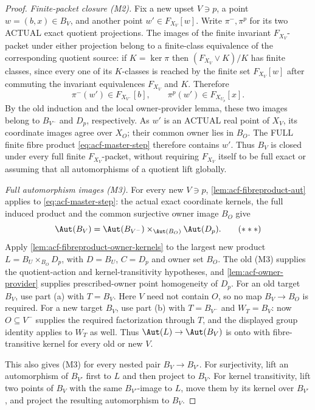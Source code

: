 \begin{proof}
\emph{Finite-packet closure (M2).}
Fix a new upset \(V\ni p\), a point
\(w=(b,x)\in B_V\), and another point
\(w'\in F_{X_V}[w]\). Write \(\pi^-,\pi^p\)
for its two ACTUAL exact quotient
projections. The images of the finite
invariant \(F_{X_V}\)-packet under
either projection belong to a finite-class
equivalence of the corresponding
quotient source: if \(K=\ker\pi\)
then \((F_{X_V}\vee K)/K\) has finite
classes, since every one of its
\(K\)-classes is reached by the finite
set \(F_{X_V}[w]\) after commuting
the invariant equivalences
\(F_{X_V}\) and \(K\).
Therefore
\[
 \pi^-(w')\in F_{X_{V^-}}[b],
 \qquad
 \pi^p(w')\in F_{X_{U_p}}[x].
\]
By the old induction and the
local owner-provider lemma, these
two images belong to
\(B_{V^-}\) and \(D_p\),
respectively. As \(w'\) is an
ACTUAL real point of \(X_V\),
its coordinate images agree
over \(X_O\); their common owner
lies in \(B_O\).
The FULL finite fibre product
\eqref{eq:acf-master-step} therefore
contains \(w'\). Thus \(B_V\)
is closed under every full finite
\(F_{X_V}\)-packet, without
requiring \(F_{X_V}\) itself
to be full exact or assuming that
all automorphisms of a quotient
lift globally.

\emph{Full automorphism images (M3).}
For every new $V\ni p$, \cref{lem:acf-fibreproduct-aut} applies to
\eqref{eq:acf-master-step}: the actual exact coordinate kernels,
the full induced product and the common surjective owner image
$B_O$ give
\[
 \Aut(B_V)=
       \Aut(B_{V^-})\times_{\Aut(B_O)}\Aut(D_p).
       \tag{\(\ast\ast\ast\)}
\]
Apply \cref{lem:acf-fibreproduct-owner-kernels} to the largest new
product $L=B_U\times_{B_O}D_p$, with $D=B_U$, $C=D_p$ and
owner set $B_O$. The old (M3) supplies the quotient-action and
kernel-transitivity hypotheses, and
\cref{lem:acf-owner-provider} supplies prescribed-owner point
homogeneity of $D_p$.
For an old target $B_V$, use part (a) with $T=B_V$.
Here $V$ need not contain $O$, so no map $B_V\to B_O$ is required.
For a new target $B_V$, use part (b) with $T=B_{V^-}$ and
$W_T=B_V$: now $O\subseteq V^-$ supplies the required
factorization through $T$, and the displayed group identity
applies to $W_T$ as well.
Thus $\Aut(L)\to\Aut(B_V)$ is onto with fibre-transitive
kernel for every old or new $V$.

This also gives (M3) for every nested pair $B_V\to B_{V'}$.
For surjectivity, lift an automorphism of $B_{V'}$ first to $L$
and then project to $B_V$. For kernel transitivity, lift two
points of $B_V$ with the same $B_{V'}$-image to $L$, move them
by its kernel over $B_{V'}$, and project the resulting
automorphism to $B_V$.


\end{proof}
